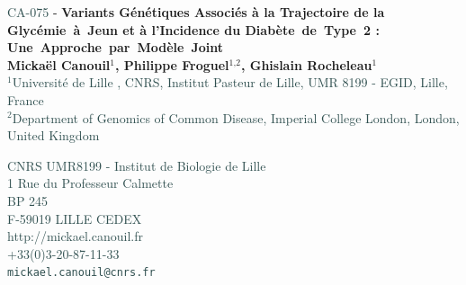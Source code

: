 \documentclass[10pt,a0,portrait]{a0poster}
\newcommand{\superscript}[1]{\ensuremath{^{\textrm{#1}}}}
\begin{document}
\Large

\begin{minipage}[t]{0.70\linewidth}
\flushleft
{\huge \textcolor{ku}{{\textcolor{DarkSlateGray}{CA-075} \textcolor{black}{-} \textbf{Variants Génétiques Associés à la Trajectoire de la \mbox{Glycémie à Jeun} et à l’Incidence du \mbox{Diabète de Type 2} : \linebreak\mbox{Une Approche par Modèle Joint}}}}}\\ %
\vspace{1cm}
{\large \textbf{Mickaël Canouil\superscript{1}, Philippe Froguel\superscript{1,2}, Ghislain Rocheleau\superscript{1}}\\[0.5cm] %
\textcolor{DarkSlateGray}{\normalsize
\superscript{1}Université de Lille , CNRS, Institut Pasteur de Lille, UMR 8199 - EGID, Lille, France\\
\superscript{2}Department of Genomics of Common Disease, Imperial College London, London, United Kingdom\\
}}
\end{minipage}
%
\begin{minipage}[t]{0.30\linewidth}
\flushright
\textcolor{DarkSlateGray}{
{\large CNRS UMR8199 - Institut de Biologie de Lille\\
1 Rue du Professeur Calmette\\
BP 245\\
F-59019 LILLE CEDEX\\[0.45cm]
http://mickael.canouil.fr\\
+33(0)3-20-87-11-33\\[-0.50cm]
\texttt{mickael.canouil@cnrs.fr}}
}
\end{minipage}

\end{document}
